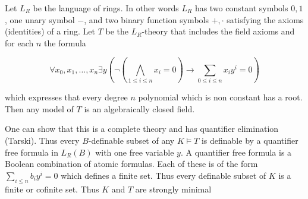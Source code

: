 \documentclass[12pt]{article}
\begin{document}
Let $L_{R}$ be the language of rings. 
In other words $L_{R}$ has two constant symbols $0,1$, one unary symbol $-$, and two binary function symbols $+,\cdot$ satisfying the axioms (identities) of a ring.  Let $T$ be the $L_{R}$-theory that includes the field axioms and for each $n$ the formula

\begin{displaymath} \forall x_{0},x_{1},\ldots,x_{n} \exists y (\lnot (\bigwedge_{1 \leq i \leq n}x_{i}=0) \rightarrow \sum_{0 \leq i \leq n}x_{i}y^{i}=0) \end{displaymath}

which expresses that every degree $n$ polynomial which is non constant has a root.  Then any model of $T$ is an algebraically closed field. 

One can show that this is a complete theory and has quantifier elimination (Tarski). 
Thus every $B$-definable subset of any $K \models T$ is definable by a quantifier free formula in $L_{R}(B)$ with one free variable $y$. 
A quantifier free formula is a Boolean combination of atomic formulas. 
Each of these is of the form $\sum_{i\leq n}b_{i}y^{i}=0$ which defines a finite set. 
Thus every definable subset of $K$ is a finite or cofinite set. 
Thus $K$ and $T$ are strongly minimal
\end{document}

